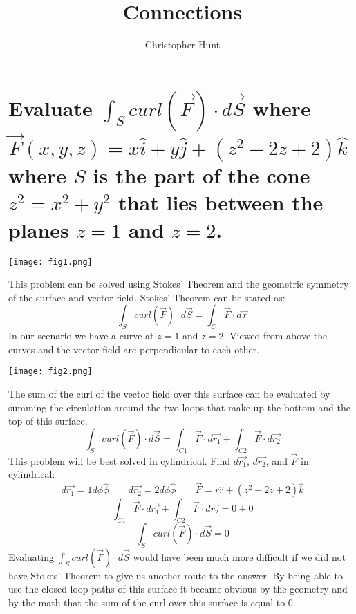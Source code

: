 \documentclass[11pt]{article}
\title{Connections}
\author{Christopher Hunt}
\date{}
\begin{document}
\pagestyle{fancy}
\fancyhf{}
\rhead{\thepage}
\maketitle
\section*{Evaluate $\int_S curl(\vec{F})\cdot d\vec{S}$ where $\vec{F}(x,y,z) = x\hat{i}+y\hat{j}+(z^2-2z+2)\hat{k}$ where $S$ is the part of the cone $z^2=x^2+y^2$ that lies between the planes $z=1$ and $z=2$.}
\begin{center}
    \texttt{[image: fig1.png]}
\end{center}
This problem can be solved using Stokes' Theorem and the geometric symmetry of the surface and vector field. Stokes' Theorem can be stated as:
$$\int_S curl(\vec{F})\cdot d\vec{S} = \int_C \vec{F}\cdot d\vec{r}$$
In our scenario we have a curve at $z=1$ and $z=2$. Viewed from above the curves and the vector field are perpendicular to each other.
\begin{center}
    \texttt{[image: fig2.png]}
\end{center}
The sum of the curl of the vector field over this surface can be evaluated by summing the circulation around the two loops that make up the bottom and the top of this surface.
$$\int_S curl(\vec{F})\cdot d\vec{S} = \int_{C1} \vec{F}\cdot d\vec{r_1}+\int_{C2} \vec{F}\cdot d\vec{r_2}$$
This problem will be best solved in cylindrical. Find $d\vec{r_1}$, $d\vec{r_2}$, and $\vec{F}$ in cylindrical:
$$d\vec{r_1} = 1d\phi \hat{\phi}\qquad d\vec{r_2} = 2d\phi \hat{\phi} \qquad \vec{F} = r\hat{r}+(z^2-2z+2)\hat{k}$$
$$\int_{C1} \vec{F}\cdot d\vec{r_1}+\int_{C2} \vec{F}\cdot d\vec{r_2} = 0 + 0$$
$$\int_S curl(\vec{F})\cdot d\vec{S} = 0 $$
Evaluating $\int_S curl(\vec{F})\cdot d\vec{S}$ would have been much more difficult if we did not have Stokes' Theorem to give us another route to the answer. By being able to use the closed loop paths of this surface it became obvious by the geometry and by the math that the sum of the curl over this surface is equal to 0. 
\end{document}
